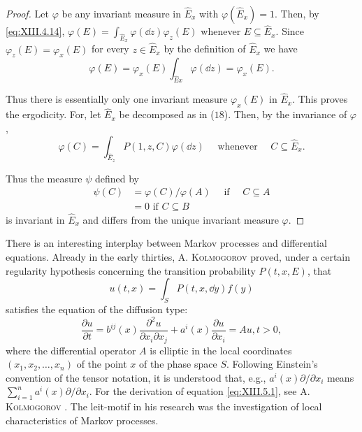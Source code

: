 \begin{proof}
 Let $\varphi$ be any invariant measure in $\hat{E}_x$ with $\varphi(\hat{E}_x) = 1$. Then, by \eqref{eq:XIII.4.14}, $\varphi(E) = \int_{\hat{E}_x} \varphi(\dd z) \varphi_z(E)$ whenever $E \subseteq \hat{E}_x$. Since $\varphi_z(E) = \varphi_x(E)$ for every $z \in \hat{E}_x$ by the definition of $\hat{E}_x$ we have 
\[
\varphi (E) = \varphi_{x} (E) \int_ {\hat {E} x} \varphi (\dd z) = \varphi_{x} (E). \]

Thus there is essentially only one invariant measure $\varphi_{x}(E)$ in $\hat{E}_{x}$. This proves the ergodicity. For, let $\hat{E}_{x}$ be decomposed as in ($18$). Then, by the invariance of $\varphi$, 
\[
\varphi (C) = \int_ {\hat {E} _{z}} P (1, z, C) \varphi (\dd z) \quad \text{ whenever } \quad C \subseteq \hat {E} _{x}.
\]

Thus the measure $\psi$ defined by 
\[
\begin{aligned} \psi (C) & = \varphi (C) / \varphi (A) \quad \text{ if } \quad C \subseteq A \\ & = 0 \text{ if } C \subseteq B \end{aligned}
\]
is invariant in $\hat{E}_x$ and differs from the unique invariant measure $\varphi$. 
\end{proof}


\label{sec:XIII.5}

There is an interesting interplay between Markov processes and differential equations. Already in the early thirties, A. \textsc{Kolmogorov} proved, under a certain regularity hypothesis concerning the transition probability $P(t, x, E)$, that 
\[
u (t, x) = \int_{S} P (t, x, \dd y) f (y)
\]
satisfies the equation of the diffusion type: 
\begin{equation}\label{eq:XIII.5.1}
\frac {\partial u}{\partial t} = b ^{ij} (x) \frac {\partial^{2} u}{\partial x _{i} \partial x _{j}} + a ^{i} (x) \frac {\partial u}{\partial x _{i}} = A u, t > 0,
\end{equation}
where the differential operator $A$ is elliptic in the local coordinates $(x_1, x_2, \ldots, x_n)$ of the point $x$ of the phase space $S$. Following Einstein's convention of the tensor notation, it is understood that, e.g., $a^i(x) \partial/\partial x_i$ means $\sum\limits_{i=1}^{n} a^i(x) \partial/\partial x_i$. For the derivation of equation \eqref{eq:XIII.5.1}, see A. \textsc{Kolmogorov} \cite{kolmogorov152}. The leit-motif in his research was the investigation of local characteristics of Markov processes. 

